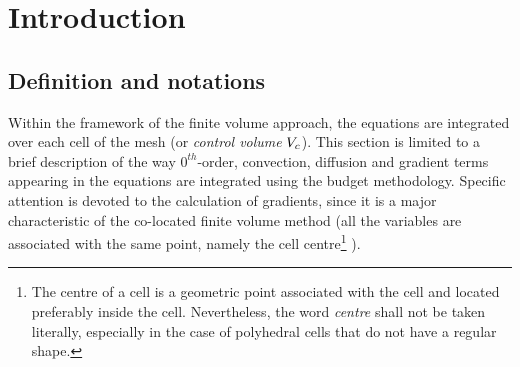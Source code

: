 
%
%
%
%


\section{Introduction}

\subsection{Definition and notations}\label{sec:spadis:notations}

Within the framework of the finite volume approach, the equations are
integrated over each cell of the mesh (or \emph{control volume} $V_{c}$).
This section is limited to a brief description of the way $0^{th}$-order, convection, diffusion and gradient terms appearing in
the equations are integrated using the budget methodology. Specific attention is devoted to the
calculation of gradients, since it is a major characteristic of the
co-located finite volume method (all the variables are associated with the
same point, namely the cell centre\footnote{%
The centre of a cell is a geometric point associated with the cell and
located preferably inside the cell. Nevertheless, the word \emph{centre} shall
not be taken literally,
especially in the case of polyhedral cells that do not have a regular shape.}%
).

